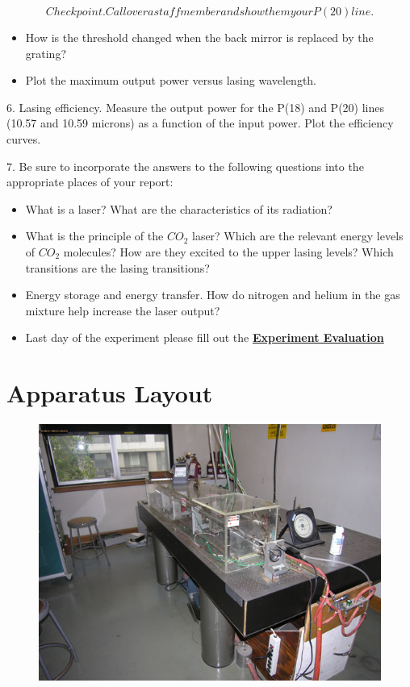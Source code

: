 \documentclass{../lab}
\begin{document}
\begin{equation}
    Checkpoint. Call over a staff member and show them your P(20) line.
\end{equation}
\begin{itemize}
    \item How is the threshold changed when the back mirror is replaced by the grating?
    \item Plot the maximum output power versus lasing wavelength.
\end{itemize}

6. Lasing efficiency. Measure the output power for the P(18) and P(20) lines (10.57 and 10.59 microns) as a function of the input power. Plot the efficiency curves.

7. Be sure to incorporate the answers to the following questions into the appropriate places of your report:

\begin{itemize}
    \item What is a laser? What are the characteristics of its radiation?
    \item What is the principle of the $CO_2 $ laser? Which are the relevant energy levels of $CO_2 $ molecules? How are they excited to the upper lasing levels? Which transitions are the lasing transitions?
    \item Energy storage and energy transfer. How do nitrogen and helium in the gas mixture help increase the laser output?
    \item Last day of the experiment please fill out the \href{\ExperimentEvaluation}{\textbf{Experiment Evaluation}}
\end{itemize}

\section{Apparatus Layout}


\begin{figure}[h]
    \centering
    \href{http://experimentationlab.berkeley.edu/sites/default/files/images/Co2_3.jpg}{\includegraphics[width=\linewidth]{images/Co2_3.jpg}}
    \caption{}
    \label{fig:Co2_3}
\end{figure}
\end{document}
